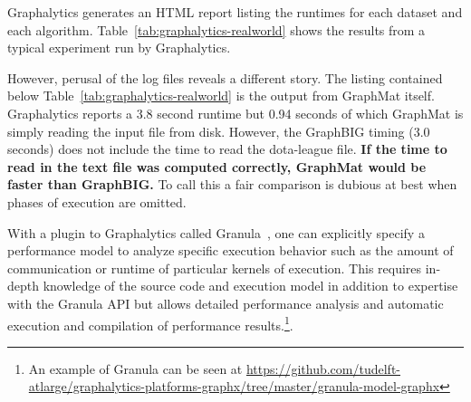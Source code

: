 \documentclass[conference]{IEEEtran}
\begin{document}
Graphalytics generates an HTML report listing the runtimes for each dataset and each algorithm. Table~\ref{tab:graphalytics-realworld} shows the results from a typical experiment run by Graphalytics.

However, perusal of the log files reveals a different story. The listing contained below Table~\ref{tab:graphalytics-realworld} is the output from GraphMat itself. Graphalytics reports a 3.8 second runtime but 0.94 seconds of which GraphMat is simply reading the input file from disk. However, the GraphBIG timing (3.0 seconds) does not include the time to read the dota-league file. \textbf{If the time to read in the text file was computed correctly, GraphMat would be faster than GraphBIG.} To call this a fair comparison is dubious at best when phases of execution are omitted.

With a plugin to Graphalytics called Granula~\cite{Ngai:2015:Granula}, one can explicitly specify a performance model to analyze specific execution behavior such as the amount of communication or runtime of particular kernels of execution. This requires in-depth knowledge of the source code and execution model in addition to expertise with the Granula API but allows detailed performance analysis and automatic execution and compilation of performance results.\footnote{An example of Granula can be seen at \url{https://github.com/tudelft-atlarge/graphalytics-platforms-graphx/tree/master/granula-model-graphx}}.
\end{document}
